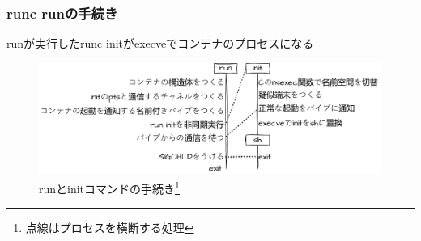 \documentclass[unicode, 14pt, aspectratio=169]{beamer}
\begin{document}
\begin{frame}
  \frametitle{runc runの手続き}
  runが実行したrunc initが\href{https://man7.org/linux/man-pages/man2/execve.2.html}{execve}でコンテナのプロセスになる
  \begin{figure}
    \centering
    \includegraphics[width=14cm]{images/overview.drawio.pdf}
    \caption{runとinitコマンドの手続き\footnote{点線はプロセスを横断する処理}}
  \end{figure}
\end{frame}
\end{document}
